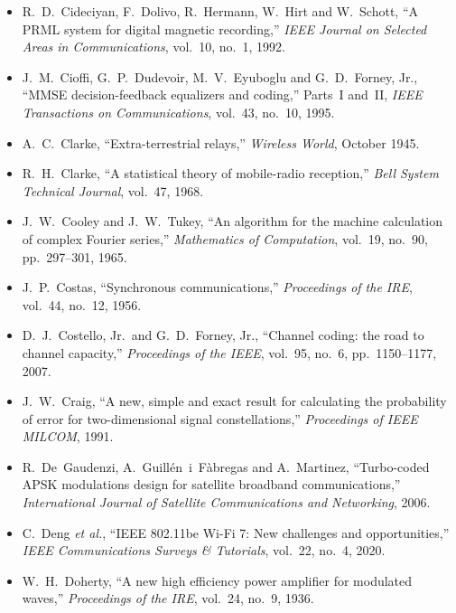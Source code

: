\begin{itemize}[leftmargin=1.5em,itemindent=-1.5em,itemsep=1.5pt plus 1pt,parsep=0pt,topsep=4pt,label={}]
\item R.~D.~Cideciyan, F.~Dolivo, R.~Hermann, W.~Hirt and W.~Schott, ``A PRML system for digital magnetic recording,'' \emph{IEEE Journal on Selected Areas in Communications}, vol.~10, no.~1, 1992.
\item J.~M.~Cioffi, G.~P.~Dudevoir, M.~V.~Eyuboglu and G.~D.~Forney, Jr., ``MMSE decision-feedback equalizers and coding,'' Parts~I and~II, \emph{IEEE Transactions on Communications}, vol.~43, no.~10, 1995.
\item A.~C.~Clarke, ``Extra-terrestrial relays,'' \emph{Wireless World}, October 1945.
\item R.~H.~Clarke, ``A statistical theory of mobile-radio reception,'' \emph{Bell System Technical Journal}, vol.~47, 1968.
\item J.~W.~Cooley and J.~W.~Tukey, ``An algorithm for the machine calculation of complex Fourier series,'' \emph{Mathematics of Computation}, vol.~19, no.~90, pp.~297--301, 1965.
\item J.~P.~Costas, ``Synchronous communications,'' \emph{Proceedings of the IRE}, vol.~44, no.~12, 1956.
\item D.~J.~Costello, Jr.\ and G.~D.~Forney, Jr., ``Channel coding: the road to channel capacity,'' \emph{Proceedings of the IEEE}, vol.~95, no.~6, pp.~1150--1177, 2007.
\item J.~W.~Craig, ``A new, simple and exact result for calculating the probability of error for two-dimensional signal constellations,'' \emph{Proceedings of IEEE MILCOM}, 1991.
\item R.~De~Gaudenzi, A.~Guill\'en~i~F\`abregas and A.~Martinez, ``Turbo-coded APSK modulations design for satellite broadband communications,'' \emph{International Journal of Satellite Communications and Networking}, 2006.
\item C.~Deng \emph{et al.}, ``IEEE 802.11be Wi-Fi 7: New challenges and opportunities,'' \emph{IEEE Communications Surveys \& Tutorials}, vol.~22, no.~4, 2020.
\item W.~H.~Doherty, ``A new high efficiency power amplifier for modulated waves,'' \emph{Proceedings of the IRE}, vol.~24, no.~9, 1936.

\end{itemize}
